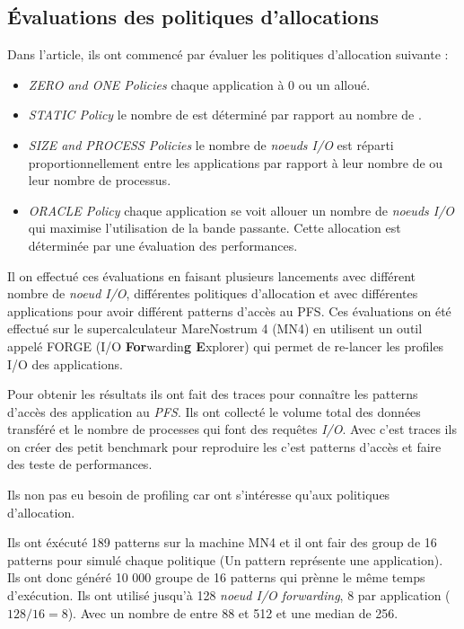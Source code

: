 \documentclass[10pt, a4paper]{article}
\begin{document}
\subsection{Évaluations des politiques d'allocations}

Dans l'article, ils ont commencé par évaluer les politiques d'allocation suivante :
\begin{itemize}
  \item \emph{ZERO and ONE Policies} chaque application à 0 ou un \noeudIO{} alloué.
  \item \emph{STATIC Policy} le nombre de \noeudsIO est déterminé par rapport au nombre de \noeudsDeCalculs{}.
  \item \emph{SIZE and PROCESS Policies} le nombre de \emph{noeuds I/O} est réparti proportionnellement entre les applications par rapport à leur nombre de \noeudsDeCalculs{} ou leur nombre de processus.
  \item \emph{ORACLE Policy} chaque application se voit allouer un nombre de \emph{noeuds I/O} qui maximise l'utilisation de la bande passante. Cette allocation est déterminée par une évaluation des performances.
\end{itemize}

Il on effectué ces évaluations en faisant plusieurs lancements avec différent nombre de \emph{noeud I/O}, différentes politiques d'allocation et avec différentes applications pour avoir différent patterns d'accès au PFS. Ces évaluations on été effectué sur le supercalculateur MareNostrum 4 (MN4) en utilisent un outil appelé FORGE (I/O \textbf{For}wardin\textbf{g E}xplorer) qui permet de re-lancer les profiles I/O des applications.

Pour obtenir les résultats ils ont fait des traces pour connaître les patterns d'accès des application au \emph{PFS}. Ils ont collecté le volume total des données transféré et le nombre de processes qui font des requêtes \emph{I/O}. Avec c'est traces ils on créer des petit benchmark pour reproduire les c'est patterns d'accès et faire des teste de performances.

Ils non pas eu besoin de profiling car ont s'intéresse qu'aux politiques d'allocation.

Ils ont éxécuté 189 patterns sur la machine MN4 et il ont fair des group de 16 patterns pour simulé chaque politique (Un pattern représente une application).
Ils ont donc généré 10 000 groupe de 16 patterns qui prènne le même temps d'exécution.
Ils ont utilisé jusqu'à 128 \emph{noeud I/O forwarding}, 8 par application ($128/16=8$). Avec un nombre de \noeudsDeCalculs{} entre 88 et 512 et une median de 256.
\end{document}
